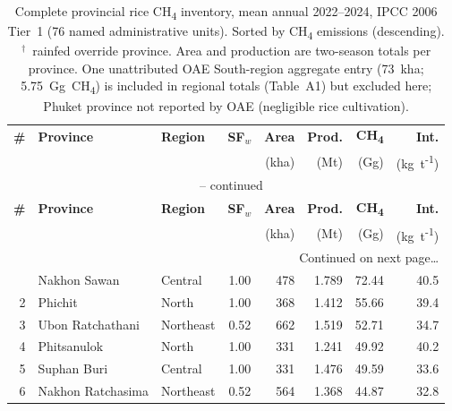 \documentclass[fleqn,10pt]{olplainarticle}
\begin{document}
\FloatBarrier
\begin{longtable}{@{}rllcrrrr@{}}
\caption{Complete provincial rice CH\textsubscript{4} inventory, mean annual
         2022--2024, IPCC 2006 Tier~1 (76 named administrative units).
         Sorted by CH\textsubscript{4} emissions (descending).
         $^\dagger$~rainfed override province.
         Area and production are two-season totals per province.
         One unattributed OAE South-region aggregate entry (73~kha; 5.75~Gg~CH\textsubscript{4})
         is included in regional totals (Table~A1) but excluded here;
         Phuket province not reported by OAE (negligible rice cultivation).}
\label{tab:all76} \\
\toprule
\textbf{\#} & \textbf{Province} & \textbf{Region} & \textbf{SF$_w$} &
  \textbf{Area} & \textbf{Prod.} & \textbf{CH\textsubscript{4}} &
  \textbf{Int.} \\
 & & & & \footnotesize(kha) & \footnotesize(Mt) &
  \footnotesize(Gg) & \footnotesize(kg~t\textsuperscript{-1}) \\
\midrule
\endfirsthead
\multicolumn{8}{c}{\tablename\ \thetable{} -- continued}\\
\toprule
\textbf{\#} & \textbf{Province} & \textbf{Region} & \textbf{SF$_w$} &
  \textbf{Area} & \textbf{Prod.} & \textbf{CH\textsubscript{4}} &
  \textbf{Int.} \\
 & & & & \footnotesize(kha) & \footnotesize(Mt) &
  \footnotesize(Gg) & \footnotesize(kg~t\textsuperscript{-1}) \\
\midrule
\endhead
\midrule
\multicolumn{8}{r}{\footnotesize Continued on next page\ldots}\\
\endfoot
\bottomrule
\multicolumn{8}{@{}l@{}}{\footnotesize Source: OAE \citep{oae2024}; IPCC 2006 \citep{ipcc2006}; authors' calculation.}
\endlastfoot
 1 & Nakhon Sawan       & Central   & 1.00          & 478 & 1.789 & 72.44 & 40.5 \\
 2 & Phichit            & North     & 1.00          & 368 & 1.412 & 55.66 & 39.4 \\
 3 & Ubon Ratchathani   & Northeast & 0.52          & 662 & 1.519 & 52.71 & 34.7 \\
 4 & Phitsanulok        & North     & 1.00          & 331 & 1.241 & 49.92 & 40.2 \\
 5 & Suphan Buri        & Central   & 1.00          & 331 & 1.476 & 49.59 & 33.6 \\
 6 & Nakhon Ratchasima  & Northeast & 0.52          & 564 & 1.368 & 44.87 & 32.8 \\

\end{longtable}
\end{document}
